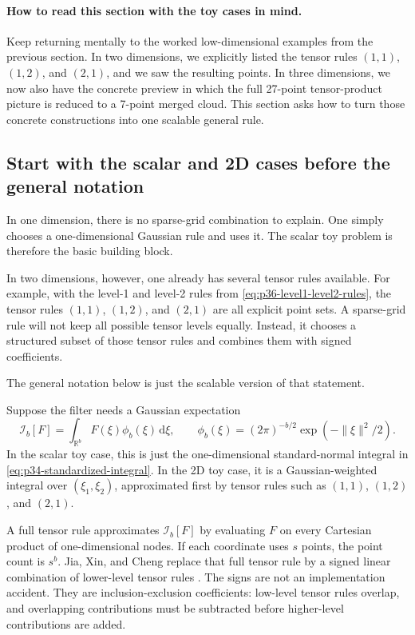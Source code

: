\documentclass[11pt]{article}
\numberwithin{equation}{section}
\newcommand{\R}{\mathbb R}
\newcommand{\dd}{\,\mathrm d}
\begin{document}
\paragraph{How to read this section with the toy cases in mind.}
Keep returning mentally to the worked low-dimensional examples from the previous
section.  In two dimensions, we explicitly listed the tensor rules
\((1,1)\), \((1,2)\), and \((2,1)\), and we saw the resulting points.  In three
dimensions, we now also have the concrete preview in which the full 27-point
tensor-product picture is reduced to a 7-point merged cloud.  This section asks
how to turn those concrete constructions into one scalable general rule.

\subsection{Start with the scalar and 2D cases before the general notation}

In one dimension, there is no sparse-grid combination to explain.  One simply
chooses a one-dimensional Gaussian rule and uses it.  The scalar toy problem is
therefore the basic building block.

In two dimensions, however, one already has several tensor rules available.  For
example, with the level-1 and level-2 rules from
\eqref{eq:p36-level1-level2-rules}, the tensor rules \((1,1)\), \((1,2)\), and
\((2,1)\) are all explicit point sets.  A sparse-grid rule will not keep all
possible tensor levels equally.  Instead, it chooses a structured subset of
those tensor rules and combines them with signed coefficients.

The general notation below is just the scalable version of that statement.

Suppose the filter needs a Gaussian expectation
\begin{equation}
  \mathcal I_b[F]
  =
  \int_{\R^b}F(\xi)\phi_b(\xi)\dd\xi,
  \qquad
  \phi_b(\xi)=(2\pi)^{-b/2}\exp(-\|\xi\|^2/2).
  \label{eq:p32-gaussian-integral-target}
\end{equation}
In the scalar toy case, this is just the one-dimensional standard-normal integral
in \eqref{eq:p34-standardized-integral}.  In the 2D toy case, it is a
Gaussian-weighted integral over \((\xi_1,\xi_2)\), approximated first by tensor
rules such as \((1,1)\), \((1,2)\), and \((2,1)\).

A full tensor rule approximates \(\mathcal I_b[F]\) by evaluating \(F\) on
every Cartesian product of one-dimensional nodes.  If each coordinate uses
\(s\) points, the point count is \(s^b\).  Jia, Xin, and Cheng replace that
full tensor rule by a signed linear combination of lower-level tensor rules
\cite[Section 3.1]{jia2012sparsegrid}.  The signs are not an implementation
accident.  They are inclusion-exclusion coefficients: low-level tensor rules
overlap, and overlapping contributions must be subtracted before higher-level
contributions are added.
\end{document}
